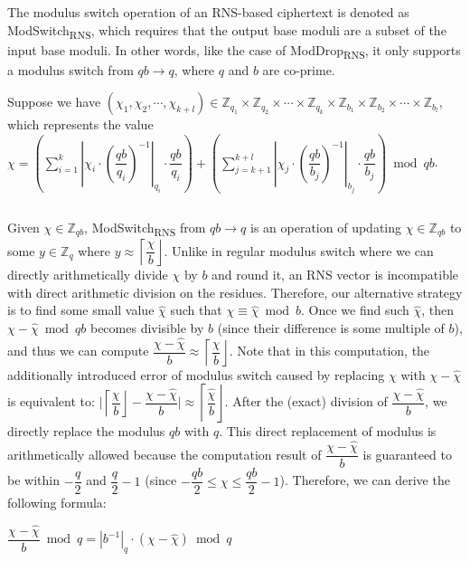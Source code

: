 The modulus switch operation of an RNS-based ciphertext is denoted as \textsf{ModSwitch\textsubscript{RNS}}, which requires that the output base moduli are a subset of the input base moduli. In other words, like the case of \textsf{ModDrop\textsubscript{RNS}}, it only supports a modulus switch from $qb \rightarrow q$, where $q$ and $b$ are co-prime. 


Suppose we have $(\chi_1, \chi_2, \cdots, \chi_{k+l}) \in \mathbb{Z}_{q_1} \times \mathbb{Z}_{q_2} \times \cdots \times \mathbb{Z}_{q_k} \times \mathbb{Z}_{b_1} \times \mathbb{Z}_{b_2} \times \cdots \times \mathbb{Z}_{b_l} $, which represents the value $\chi = \left(\sum\limits_{i=1}^{k}\left|\chi_i\cdot\left(\dfrac{qb}{q_i}\right)^{-1}\right|_{q_i}\cdot\dfrac{qb}{q_i}\right) + \left(\sum\limits_{j=k+1}^{k+l}\left|\chi_j\cdot\left(\dfrac{qb}{b_j}\right)^{-1}\right|_{b_j}\cdot\dfrac{qb}{b_j}\right) \bmod qb$. 

$ $

Given $\chi \in \mathbb{Z}_{qb}$, \textsf{ModSwitch\textsubscript{RNS}} from $qb \rightarrow q$ is an operation of updating $\chi \in \mathbb{Z}_{qb}$ to some $y \in \mathbb{Z}_q$ where $y \approx \left\lceil\dfrac{\chi}{b}\right\rfloor$. Unlike in regular modulus switch where we can directly arithmetically divide $\chi$ by $b$ and round it, an RNS vector is incompatible with direct arithmetic division on the residues. Therefore, our alternative strategy is to find some small value $\hat{\chi}$ such that $\chi \equiv \hat{\chi} \bmod b$. Once we find such $\hat\chi$, then $\chi - \hat{\chi} \bmod qb$ becomes divisible by $b$ (since their difference is some multiple of $b$), and thus we can compute $\dfrac{\chi - \hat{\chi}}{b} \approx \left\lceil\dfrac{\chi}{b}\right\rfloor$. Note that in this computation, the additionally introduced error of modulus switch caused by replacing $\chi$ with $\chi - \hat\chi$ is equivalent to: $\Bigg|\left\lceil\dfrac{\chi}{b}\right\rfloor - \dfrac{\chi - \hat\chi}{b}\Bigg| \approx \left\lceil\dfrac{\hat\chi}{b}\right\rfloor$. After the (exact) division of $\dfrac{\chi - \hat\chi}{b}$, we directly replace the modulus $qb$ with $q$. This direct replacement of modulus is arithmetically allowed because the computation result of $\dfrac{\chi - \hat{\chi}}{b}$ is guaranteed to be within $-\dfrac{q}{2}$ and $\dfrac{q}{2} -1$ (since $-\dfrac{qb}{2}\leq \chi \leq \dfrac{qb}{2}-1$). Therefore, we can derive the following formula:

$\dfrac{\chi - \hat{\chi}}{b} \bmod q = |b^{-1}|_{q}\cdot (\chi - \hat{\chi}) \bmod q$  %

